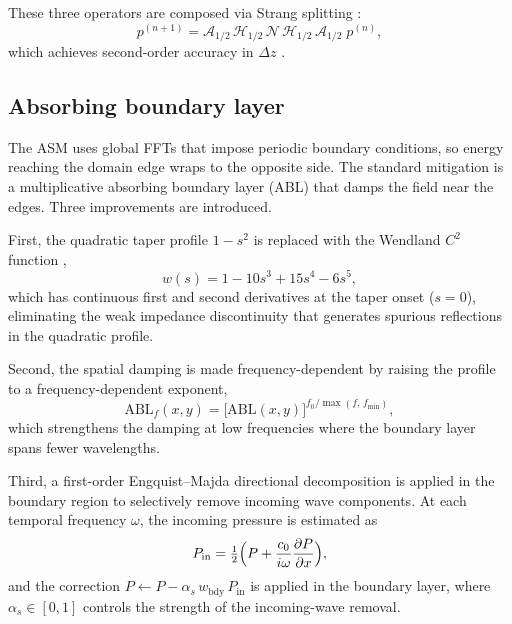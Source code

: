 \documentclass[11pt]{article}
\begin{document}
These three operators are composed via Strang splitting
\cite{strang1968,leveque2002}:
\begin{equation}
  p^{(n+1)} = \mathcal{A}_{1/2}\,\mathcal{H}_{1/2}\,
  \mathcal{N}\,
  \mathcal{H}_{1/2}\,\mathcal{A}_{1/2}\;p^{(n)},
  \label{eq:strang}
\end{equation}
which achieves second-order accuracy in $\Delta z$
\cite{yoshida1990}.

\subsection{Absorbing boundary layer}

The ASM uses global FFTs that impose periodic boundary conditions, so
energy reaching the domain edge wraps to the opposite side.  The
standard mitigation is a multiplicative absorbing boundary layer (ABL)
that damps the field near the edges.  Three improvements are
introduced.

First, the quadratic taper profile $1 - s^2$ is replaced with the
Wendland $C^2$ function \cite{wendland1995},
\begin{equation}
  w(s) = 1 - 10s^3 + 15s^4 - 6s^5,
  \label{eq:wendland}
\end{equation}
which has continuous first and second derivatives at the taper onset
($s = 0$), eliminating the weak impedance discontinuity that generates
spurious reflections in the quadratic profile.

Second, the spatial damping is made frequency-dependent by raising the
profile to a frequency-dependent exponent,
\begin{equation}
  \mathrm{ABL}_f(x,y) = \bigl[\mathrm{ABL}(x,y)\bigr]^{f_0/\max(f,\,f_{\min})},
  \label{eq:freq_abl}
\end{equation}
which strengthens the damping at low frequencies where the boundary
layer spans fewer wavelengths.

Third, a first-order Engquist--Majda \cite{engquist1977} directional
decomposition is applied in the boundary region to selectively remove
incoming wave components.  At each temporal frequency $\omega$, the
incoming pressure is estimated as
\begin{equation}
  P_{\mathrm{in}} = \tfrac{1}{2}\Bigl(P + \frac{c_0}{i\omega}
  \frac{\partial P}{\partial x}\Bigr),
  \label{eq:engquist}
\end{equation}
and the correction $P \leftarrow P - \alpha_s\,w_{\mathrm{bdy}}\,
P_{\mathrm{in}}$ is applied in the boundary layer, where
$\alpha_s \in [0,1]$ controls the strength of the incoming-wave
removal.
\end{document}
